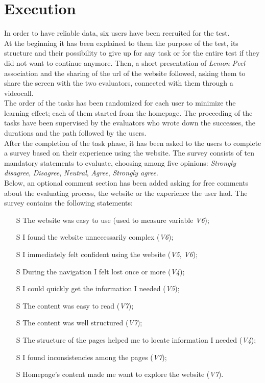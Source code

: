 \documentclass[../../UsabilityReport.tex]{subfiles}
\begin{document}
\section{Execution}\label{Execution-paragraph}
	In order to have reliable data, six users have been recruited for the test.\\
	At the beginning it has been explained to them the purpose of the test, its structure and their possibility to give up for any task or for the entire test if they did not want to continue anymore. Then, a short presentation of \textit{Lemon Peel} association and the sharing of the url of the website followed, asking them to share the screen with the two evaluators, connected with them through a videocall.\\
	The order of the tasks has been randomized for each user to minimize the learning effect; each of them started from the homepage. The proceeding of the tasks have been supervised by the evaluators who wrote down the successes, the durations and the path followed by the users.\\
	After the completion of the task phase, it has been asked to the users to complete a survey based on their experience using the website. The survey consists of ten mandatory statements to evaluate, choosing among five opinions: \textit{Strongly disagree}, \textit{Disagree}, \textit{Neutral}, \textit{Agree}, \textit{Strongly agree}.\\
	Below, an optional comment section has been added asking for free comments about the evaluating process, the website or the experience the user had.
	The survey contains the following statements:
	\begin{itemize}
		\item[S\subs{1}] The website was easy to use (used to measure variable \textit{V6});
		\item[S\subs{2}] I found the website unnecessarily complex (\textit{V6});
		\item[S\subs{3}] I immediately felt confident using the website (\textit{V5}, \textit{V6});
		\item[S\subs{4}] During the navigation I felt lost once or more (\textit{V4});
		\item[S\subs{5}] I could quickly get the information I needed (\textit{V5});
		\item[S\subs{6}] The content was easy to read (\textit{V7});
		\item[S\subs{7}] The content was well structured (\textit{V7});
		\item[S\subs{8}] The structure of the pages helped me to locate information I needed (\textit{V4});
		\item[S\subs{9}] I found inconsistencies among the pages (\textit{V7});
		\item[S\subs{10}] Homepage’s content made me want to explore the website (\textit{V7}).
	\end{itemize}
\end{document}
